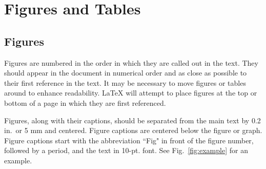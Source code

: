 \section{Figures and Tables} 

\subsection{Figures} 

Figures are numbered in the order in which they are called out in the text. They should appear in the document in numerical order and as close as possible to their first reference in the text. It may be necessary to move figures or tables around to enhance readability. LaTeX will attempt to place figures at the top or bottom of a page in which they are first referenced.

Figures, along with their captions, should be separated from the main text by  0.2 in.\ or 5 mm and centered. Figure captions are centered below the figure or graph. Figure captions start with the abbreviation ``Fig" in front of the figure number, followed by a period, and the text in 10-pt. font. See Fig.~\ref{fig:example} for an example.